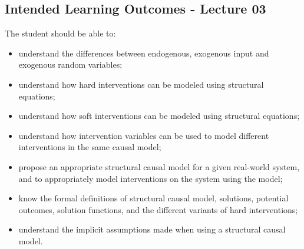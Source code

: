 \subsection*{Intended Learning Outcomes - Lecture 03}

The student should be able to:
\begin{itemize}
\item understand the differences between endogenous, exogenous input and exogenous random variables;
\item understand how hard interventions can be modeled using structural equations;
\item understand how soft interventions can be modeled using structural equations;
\item understand how intervention variables can be used to model different interventions in the same causal model;
\item propose an appropriate structural causal model for a given real-world system, and to appropriately model interventions on the system using the model;
\item know the formal definitions of structural causal model, solutions, potential outcomes, solution functions, and the different variants of hard interventions;
\item understand the implicit assumptions made when using a structural causal model.
\end{itemize}
